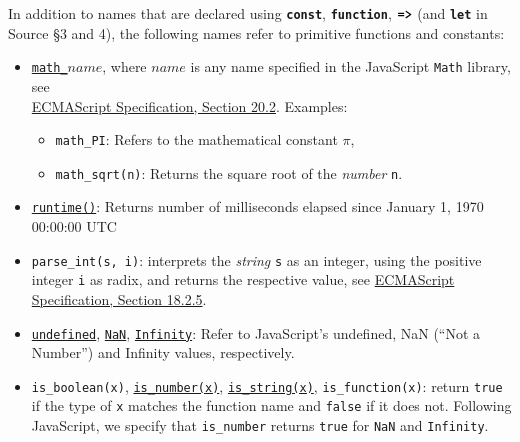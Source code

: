 In addition to names that
are declared using \texttt{\textbf{const}}, \texttt{\textbf{function}},
$\texttt{\textbf{=>}}$ (and \texttt{\textbf{let}} in Source \S3 and 4), the following
names refer to primitive functions and constants:
\begin{itemize}
\item \href{https://sicp.comp.nus.edu.sg/chapters/6\#footnote-link-4}{\lstinline{math_}$\textit{name}$},
where $\textit{name}$ is any name specified in the
JavaScript
\texttt{Math} library, see\\
\href{https://www.ecma-international.org/ecma-262/9.0/index.html\#sec-math-object}{\color{DarkBlue}ECMAScript Specification, Section 20.2}. Examples:
\begin{itemize}
\item \verb#math_PI#: Refers to the mathematical constant $\pi$,
\item \verb#math_sqrt#\texttt{(n)}: Returns the square root of the \emph{number} \texttt{n}.
\end{itemize}
\item \texttt{\href{https://sicp.comp.nus.edu.sg/chapters/17\#ex_1.22}{runtime()}}: Returns number of milliseconds elapsed since January 1, 1970 00:00:00 UTC
\item \verb#parse_int#\texttt{(s, i)}:
interprets the \emph{string} \texttt{s} as an integer, using the positive integer \texttt{i} as radix, and returns the respective value,
see \href{https://www.ecma-international.org/ecma-262/9.0/index.html\#sec-parseint-string-radix}{\color{DarkBlue}ECMAScript Specification, Section 18.2.5}.
\item \href{https://sicp.comp.nus.edu.sg/chapters/4}{\texttt{undefined}},
  \texttt{\href{https://www.ecma-international.org/ecma-262/9.0/index.html\#sec-value-properties-of-the-global-object-nan}{\color{DarkBlue}NaN}}, \texttt{\href{https://www.ecma-international.org/ecma-262/9.0/index.html\#sec-value-properties-of-the-global-object-infinity}{\color{DarkBlue}Infinity}}: Refer to JavaScript's undefined,
NaN (``Not a Number'') and Infinity values, respectively.
\item \verb#is_boolean#\texttt{(x)}, \href{https://sicp.comp.nus.edu.sg/chapters/36}{\lstinline{is_number(x)}},
  \href{https://sicp.comp.nus.edu.sg/chapters/36}{\lstinline{is_string(x)}}, \verb#is_function#\texttt{(x)}:
        return \texttt{true} if the type of \texttt{x} matches the function name and \texttt{false} if it does not. Following
        JavaScript, we specify that \verb#is_number# returns \texttt{true} for \texttt{NaN} and \texttt{Infinity}.

\end{itemize}
